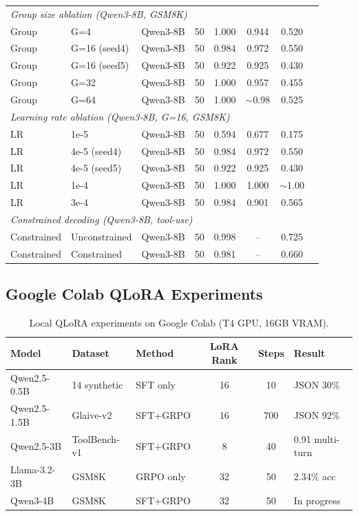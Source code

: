 \documentclass{article}
\begin{document}
\begin{table}[htbp]
\begin{tabular}{llcccccc}
        \midrule
        \multicolumn{7}{l}{\emph{Group size ablation (Qwen3-8B, GSM8K)}} \\
        Group & G=4 & Qwen3-8B & 50 & 1.000 & 0.944 & 0.520 \\
        Group & G=16 (seed4) & Qwen3-8B & 50 & 0.984 & 0.972 & 0.550 \\
        Group & G=16 (seed5) & Qwen3-8B & 50 & 0.922 & 0.925 & 0.430 \\
        Group & G=32 & Qwen3-8B & 50 & 1.000 & 0.957 & 0.455 \\
        Group & G=64 & Qwen3-8B & 50 & 1.000 & $\sim$0.98 & 0.525 \\
        \midrule
        \multicolumn{7}{l}{\emph{Learning rate ablation (Qwen3-8B, G=16, GSM8K)}} \\
        LR & 1e-5 & Qwen3-8B & 50 & 0.594 & 0.677 & 0.175 \\
        LR & 4e-5 (seed4) & Qwen3-8B & 50 & 0.984 & 0.972 & 0.550 \\
        LR & 4e-5 (seed5) & Qwen3-8B & 50 & 0.922 & 0.925 & 0.430 \\
        LR & 1e-4 & Qwen3-8B & 50 & 1.000 & 1.000 & $\sim$1.00 \\
        LR & 3e-4 & Qwen3-8B & 50 & 0.984 & 0.901 & 0.565 \\
        \midrule
        \multicolumn{7}{l}{\emph{Constrained decoding (Qwen3-8B, tool-use)}} \\
        Constrained & Unconstrained & Qwen3-8B & 50 & 0.998 & -- & 0.725 \\
        Constrained & Constrained & Qwen3-8B & 50 & 0.981 & -- & 0.660 \\
        \bottomrule
    \end{tabular}
    \label{tab:10x_runs}
\end{table}

\subsection{Google Colab QLoRA Experiments}

\begin{table}[htbp]
    \centering
    \caption{Local QLoRA experiments on Google Colab (T4 GPU, 16GB VRAM).}
    \begin{tabular}{lllccl}
        \toprule
        Model & Dataset & Method & LoRA Rank & Steps & Result \\
        \midrule
        Qwen2.5-0.5B & 14 synthetic & SFT only & 16 & 10 & JSON 30\% \\
        Qwen2.5-1.5B & Glaive-v2 & SFT+GRPO & 16 & 700 & JSON 92\% \\
        Qwen2.5-3B & ToolBench-v1 & SFT+GRPO & 8 & 40 & 0.91 multi-turn \\
        Llama-3.2-3B & GSM8K & GRPO only & 32 & 50 & 2.34\% acc \\
        Qwen3-4B & GSM8K & SFT+GRPO & 32 & 50 & In progress \\
        \bottomrule
    \end{tabular}
    \label{tab:colab_runs}
\end{table}
\end{document}
